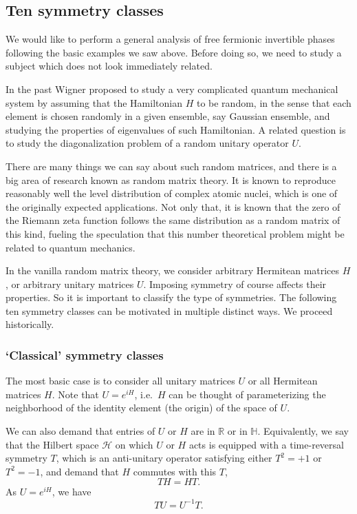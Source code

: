 \documentclass[12pt]{article}
\numberwithin{equation}{section}
\numberwithin{figure}{section}
\theoremstyle{remark}
\def\bH{\mathbb{H}}
\def\bR{\mathbb{R}}
\def\cH{\mathcal{H}}
\begin{document}
\subsection{Ten symmetry classes}

We would like to perform a general analysis of free fermionic invertible phases
following the basic examples we saw above. 
Before doing so, we need to study a subject which does not look immediately related.

In the past Wigner proposed to study a very complicated quantum mechanical system
by assuming that the Hamiltonian $H$ to be random, in the sense that
each element is chosen randomly in a given ensemble, say Gaussian ensemble,
and studying the properties of eigenvalues of such Hamiltonian. 
A related question is to study the diagonalization problem of a random unitary operator $U$.

There are many things we can say about such random matrices, and there is a big area of research known as random matrix theory. 
It is known to reproduce reasonably well the level distribution of complex atomic nuclei,
which is one of the originally expected applications. 
Not only that, it is known that the zero of the Riemann zeta function 
follows the same distribution as a random matrix of this kind,
fueling the speculation that this number theoretical problem might be related to 
quantum mechanics.

In the vanilla random matrix theory, we consider arbitrary Hermitean matrices $H$,
or arbitrary unitary matrices $U$.
Imposing symmetry of course affects their properties. 
So it is important to classify the type of symmetries. 
The following ten symmetry classes can be motivated in multiple distinct ways.
We proceed historically.

\subsubsection{`Classical' symmetry classes}

The most basic case is to consider all unitary matrices $U$ or all Hermitean matrices $H$.
Note that $U=e^{iH}$, i.e.~$H$ can be thought of parameterizing the neighborhood of
the identity element (the origin) of the space of $U$.

We can also demand that entries of $U$ or $H$ are in $\bR$ or in $\bH$.
Equivalently, we say that the Hilbert space $\cH$ on which $U$ or $H$ acts
is equipped with a time-reversal symmetry $T$, which is an anti-unitary operator 
satisfying either $T^2=+1$ or $T^2=-1$,
and demand that $H$ commutes with this $T$, \begin{equation}
TH=HT.
\end{equation}
As $U=e^{iH}$, we have \begin{equation}
TU=U^{-1}T.
\end{equation}
\end{document}

